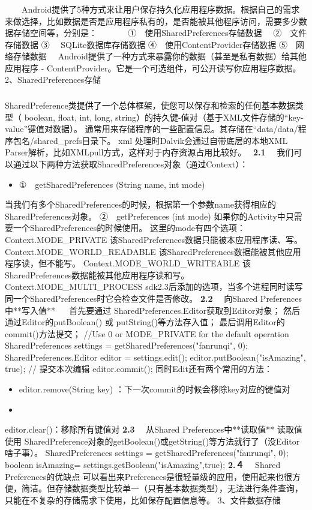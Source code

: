 \documentclass[9pt, b5paper]{article}
\begin{document}
\subsubsection{}
\label{sec-7-0-1}
 　　Android提供了5种方式来让用户保存持久化应用程序数据。根据自己的需求来做选择，比如数据是否是应用程序私有的，是否能被其他程序访问，需要多少数据存储空间等，分别是：　
 　　
①　使用SharedPreferences存储数据　
②　文件存储数据
③　 SQLite数据库存储数据
④　使用ContentProvider存储数据
⑤　网络存储数据　
Android提供了一种方式来暴露你的数据（甚至是私有数据）给其他应用程序 - ContentProvider。它是一个可选组件，可公开读写你应用程序数据。
 2、SharedPreferences存储
\subsubsection{}
\label{sec-7-0-2}
SharedPreference类提供了一个总体框架，使您可以保存和检索的任何基本数据类型（ boolean, float, int, long, string）的持久键-值对（基于XML文件存储的“key-value”键值对数据）。
通常用来存储程序的一些配置信息。其存储在“data/data/程序包名/shared\_prefs目录下。
xml 处理时Dalvik会通过自带底层的本地XML Parser解析，比如XMLpull方式，这样对于内存资源占用比较好。　
\textbf{\textbf{2.1}} 　我们可以通过以下两种方法获取SharedPreferences对象（通过Context）：
\begin{itemize}
\item ①　getSharedPreferences (String name, int mode)
\end{itemize}
当我们有多个SharedPreferences的时候，根据第一个参数name获得相应的SharedPreferences对象。
②　getPreferences (int mode)
如果你的Activity中只需要一个SharedPreferences的时候使用。 
这里的mode有四个选项：
Context.MODE\_PRIVATE
该SharedPreferences数据只能被本应用程序读、写。
Context.MODE\_WORLD\_READABLE
该SharedPreferences数据能被其他应用程序读，但不能写。
Context.MODE\_WORLD\_WRITEABLE
该SharedPreferences数据能被其他应用程序读和写。
Context.MODE\_MULTI\_PROCESS
sdk2.3后添加的选项，当多个进程同时读写同一个SharedPreferences时它会检查文件是否修改。  
\textbf{\textbf{2.2}} 　向Shared Preferences中**写入值**
　
首先要通过 SharedPreferences.Editor获取到Editor对象；
然后通过Editor的putBoolean() 或 putString()等方法存入值；
最后调用Editor的commit()方法提交；
//Use 0 or MODE\_PRIVATE for the default operation 
SharedPreferences settings = getSharedPreferences("fanrunqi", 0);
SharedPreferences.Editor editor = settings.edit();
editor.putBoolean("isAmazing", true); 
// 提交本次编辑
editor.commit();
同时Edit还有两个常用的方法：
\begin{itemize}
\item editor.remove(String key) ：下一次commit的时候会移除key对应的键值对
\item 
\end{itemize}
editor.clear()：移除所有键值对
\textbf{\textbf{2.3}} 　从Shared Preferences中**读取值** 
读取值使用 SharedPreference对象的getBoolean()或getString()等方法就行了（没Editor 啥子事）。
SharedPreferences settings = getSharedPreferences("fanrunqi", 0);
boolean isAmazing= settings.getBoolean("isAmazing",true);
\textbf{\textbf{2.４}} 　Shared Preferences的优缺点
可以看出来Preferences是很轻量级的应用，使用起来也很方便，简洁。但存储数据类型比较单一（只有基本数据类型），无法进行条件查询，只能在不复杂的存储需求下使用，比如保存配置信息等。
 3、文件数据存储
\end{document}
